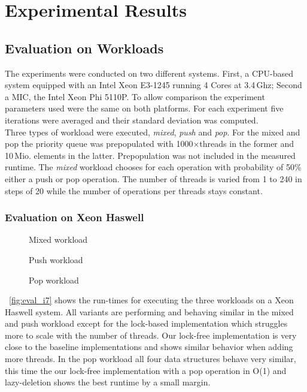 \section{Experimental Results}
\label{sec:exp}
\subsection{Evaluation on Workloads}
The experiments were conducted on two different systems. First, a CPU-based system equipped with an Intel Xeon E3-1245 running 4 Cores at 3.4\,Ghz; Second a MIC, the Intel Xeon Phi 5110P. To allow comparison the experiment parameters used were the same on both platforms. For each experiment five iterations were averaged and their standard deviation was computed.\\
Three types of workload were executed, \textit{mixed}, \textit{push} and \textit{pop}. For the mixed and pop the priority queue was prepopulated with 1000$\times$threads in the former and 10\,Mio. elements in the latter. Prepopulation was not included in the measured runtime. The \textit{mixed} workload chooses for each operation with probability of 50\% either a push or pop operation. The number of threads is varied from 1 to 240 in steps of 20 while the number of operations per threads stays constant.

\subsubsection{Evaluation on Xeon Haswell}
\begin{figure*}[t]
	\centering
	\begin{subfigure}[b]{0.3\textwidth}
		\centering
		
		\caption{Mixed workload}
		\label{fig:xeon_mixed}
	\end{subfigure}
	\hfill
	\begin{subfigure}[b]{0.3\textwidth}
		\centering
		
		\caption{Push workload}
		\label{fig:xeon_push}
	\end{subfigure}
	\hfill
	\begin{subfigure}[b]{0.3\textwidth}
		\centering
		
		\caption{Pop workload}
		\label{fig:xeon_pop}
	\end{subfigure}
	\caption{Runtime for different workloads executed on a Xeon E3-1245 while varying the number of threads}
	\label{fig:eval_i7}
\end{figure*}
\figurename~\ref{fig:eval_i7} shows the run-times for executing the three workloads on a Xeon Haswell system. All variants are performing and behaving similar in the mixed and push workload except for the lock-based implementation which struggles more to scale with the number of threads. Our lock-free implementation is very close to the baseline implementations and shows similar behavior when adding more threads. In the pop workload all four data structures behave very similar, this time the our lock-free implementation with a pop operation in O(1) and lazy-deletion shows the best runtime by a small margin.

